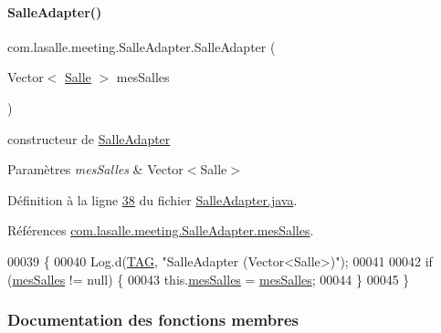 \paragraph{\texorpdfstring{Salle\+Adapter()}{SalleAdapter()}}
{\footnotesize\ttfamily com.\+lasalle.\+meeting.\+Salle\+Adapter.\+Salle\+Adapter (\begin{DoxyParamCaption}\item[{Vector$<$ \hyperlink{classcom_1_1lasalle_1_1meeting_1_1_salle}{Salle} $>$}]{mes\+Salles }\end{DoxyParamCaption})}



constructeur de \hyperlink{classcom_1_1lasalle_1_1meeting_1_1_salle_adapter}{Salle\+Adapter} 


\begin{DoxyParams}{Paramètres}
{\em mes\+Salles} & Vector$<$\+Salle$>$ \\
\hline
\end{DoxyParams}


Définition à la ligne \hyperlink{_salle_adapter_8java_source_l00038}{38} du fichier \hyperlink{_salle_adapter_8java_source}{Salle\+Adapter.\+java}.



Références \hyperlink{_salle_adapter_8java_source_l00032}{com.\+lasalle.\+meeting.\+Salle\+Adapter.\+mes\+Salles}.


\begin{DoxyCode}
00039     \{
00040         Log.d(\hyperlink{classcom_1_1lasalle_1_1meeting_1_1_salle_adapter_a774947591a1beedaffd58989783206b1}{TAG}, \textcolor{stringliteral}{"SalleAdapter (Vector<Salle>)"});
00041 
00042         \textcolor{keywordflow}{if} (\hyperlink{classcom_1_1lasalle_1_1meeting_1_1_salle_adapter_a3988ff211fbf3052b553d77ba0711a5a}{mesSalles} != null) \{
00043             this.\hyperlink{classcom_1_1lasalle_1_1meeting_1_1_salle_adapter_a3988ff211fbf3052b553d77ba0711a5a}{mesSalles} = \hyperlink{classcom_1_1lasalle_1_1meeting_1_1_salle_adapter_a3988ff211fbf3052b553d77ba0711a5a}{mesSalles};
00044         \}
00045     \}
\end{DoxyCode}


\subsubsection{Documentation des fonctions membres}
\mbox{\label{classcom_1_1lasalle_1_1meeting_1_1_salle_adapter_a4ee9f3c4b020c3bfd88e072bb21bc5fc}} 
